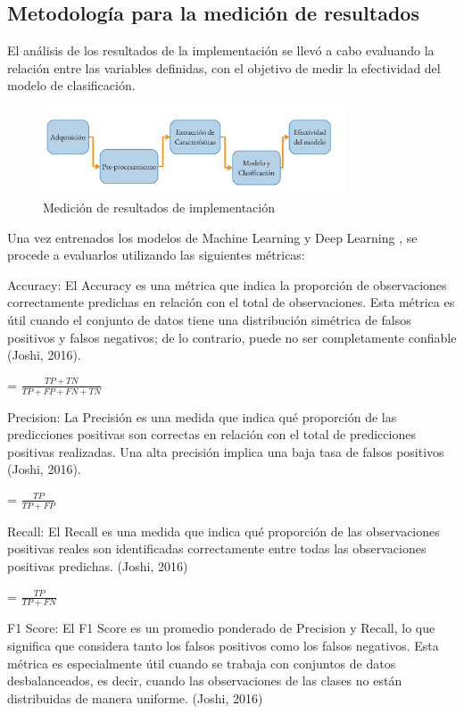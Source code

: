\subsection{Metodología para la medición de resultados}
El análisis de los resultados de la implementación se llevó a cabo evaluando la relación entre las variables definidas, con el objetivo de medir la efectividad del modelo de clasificación.

\begin{figure}[H]
	\begin{center}
		\includegraphics[width=0.8\textwidth]{3/figures/meto2.jpg}
		\caption{Medición de resultados de implementación}
		\label{}
	\end{center}
\end{figure}

Una vez entrenados los modelos de Machine Learning y Deep Learning , se procede a evaluarlos utilizando las siguientes métricas:

Accuracy:
El Accuracy es una métrica que indica la proporción de observaciones correctamente predichas en relación con el total de observaciones. Esta métrica es útil cuando el conjunto de datos tiene una distribución simétrica de falsos positivos y falsos negativos; de lo contrario, puede no ser completamente confiable (Joshi, 2016).

 = \(\frac{TP + TN}{TP + FP + FN + TN}\)

Precision:
 La Precisión es una medida que indica qué proporción de las predicciones positivas son correctas en relación con el total de predicciones positivas realizadas. Una alta precisión implica una baja tasa de falsos positivos (Joshi, 2016).
 
 = \(\frac{TP}{TP + FP}\)


Recall:
El Recall es una medida que indica qué proporción de las observaciones positivas reales son identificadas correctamente entre todas las observaciones positivas predichas. (Joshi, 2016)

 = \(\frac{TP}{TP + FN}\)

F1 Score:
El F1 Score es un promedio ponderado de Precision y Recall, lo que significa que considera tanto los falsos positivos como los falsos negativos. Esta métrica es especialmente útil cuando se trabaja con conjuntos de datos desbalanceados, es decir, cuando las observaciones de las clases no están distribuidas de manera uniforme. (Joshi, 2016)

